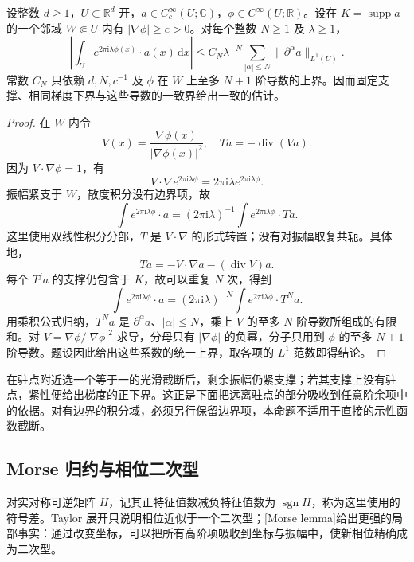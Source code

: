 \begin{proposition}[多维非驻相衰减]\label{b2:prop:21-nonstationary-multi}
设整数 \(d\geq1\)，\(U\subset\mathbb R^d\) 开，\(a\in C_c^\infty(U;\mathbb C)\)，\(\phi\in C^\infty(U;\mathbb R)\)。设在 \(K=\operatorname{supp}a\) 的一个邻域 \(W\Subset U\) 内有 \(|\nabla\phi|\geq c>0\)。对每个整数 \(N\geq1\) 及 \(\lambda\geq1\)，
\[
 \left|\int_U e^{2\pi\mathrm i\lambda\phi(x)}
                   \cdot a(x)\,\mathrm dx\right|
 \leq C_N\lambda^{-N}
       \sum_{|\alpha|\leq N}\|\partial^\alpha a\|_{L^1(U)}.
\]
常数 \(C_N\) 只依赖 \(d,N,c^{-1}\) 及 \(\phi\) 在 \(W\) 上至多 \(N+1\) 阶导数的上界。因而固定支撑、相同梯度下界与这些导数的一致界给出一致的估计。
\end{proposition}
\begin{proof}
在 \(W\) 内令
\[
 V(x)=\frac{\nabla\phi(x)}{|\nabla\phi(x)|^2},
 \quad
 Ta=-\operatorname{div}(Va).
\]
因为 \(V\cdot\nabla\phi=1\)，有
\[
 V\cdot\nabla e^{2\pi\mathrm i\lambda\phi}
 =2\pi\mathrm i\lambda e^{2\pi\mathrm i\lambda\phi}.
\]
振幅紧支于 \(W\)，散度积分没有边界项，故
\[
 \int e^{2\pi\mathrm i\lambda\phi}\cdot a
 =(2\pi\mathrm i\lambda)^{-1}
   \int e^{2\pi\mathrm i\lambda\phi}\cdot Ta.
\]
这里使用双线性积分分部，\(T\) 是 \(V\cdot\nabla\) 的形式转置；没有对振幅取复共轭。具体地，
\[
 Ta=-V\cdot\nabla a-(\operatorname{div}V)a.
\]
每个 \(T^ja\) 的支撑仍包含于 \(K\)，故可以重复 \(N\) 次，得到
\[
 \int e^{2\pi\mathrm i\lambda\phi}\cdot a
 =(2\pi\mathrm i\lambda)^{-N}
   \int e^{2\pi\mathrm i\lambda\phi}\cdot T^Na.
\]
用乘积公式归纳，\(T^Na\) 是 \(\partial^\alpha a\)、\(|\alpha|\leq N\)，乘上 \(V\) 的至多 \(N\) 阶导数所组成的有限和。对 \(V=\nabla\phi/|\nabla\phi|^2\) 求导，分母只有 \(|\nabla\phi|\) 的负幂，分子只用到 \(\phi\) 的至多 \(N+1\) 阶导数。题设因此给出这些系数的统一上界，取各项的 \(L^1\) 范数即得结论。
\end{proof}

在驻点附近选一个等于一的光滑截断后，剩余振幅仍紧支撑；若其支撑上没有驻点，紧性便给出梯度的正下界。这正是下面把远离驻点的部分吸收到任意阶余项中的依据。对有边界的积分域，必须另行保留边界项，本命题不适用于直接的示性函数截断。

\subsection{Morse 归约与相位二次型}
\label{b2:subsec:210202}

对实对称可逆矩阵 \(H\)，记其正特征值数减负特征值数为 \(\operatorname{sgn}H\)，称为这里使用的符号差。Taylor 展开只说明相位近似于一个二次型；[Morse lemma]给出更强的局部事实：通过改变坐标，可以把所有高阶项吸收到坐标与振幅中，使新相位精确成为二次型。

